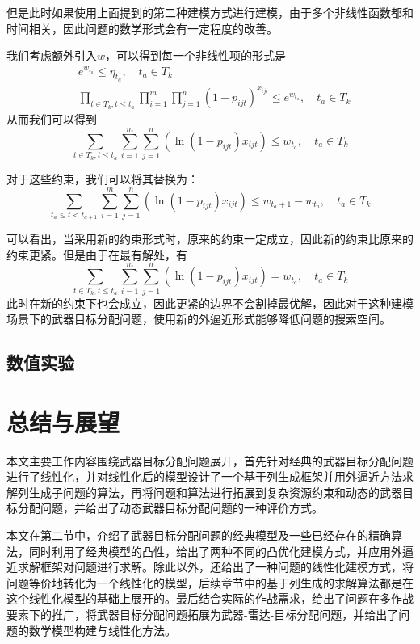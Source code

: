 但是此时如果使用上面提到的第二种建模方式进行建模，由于多个非线性函数都和时间相关，因此问题的数学形式会有一定程度的改善。

我们考虑额外引入$w$，可以得到每一个非线性项的形式是
\begin{align*}
    & e^{w_{t_a}} \leq \eta_{t_a},\quad t_a \in T_k\\
    & \prod_{t \in T_k, t \leq t_a}\prod_{i = 1}^{m}\prod_{j=1}^{n}(1-p_{ijt})^{x_{ijt}} \leq e^{w_{t_a}},\quad t_a \in T_k
\end{align*}
从而我们可以得到
\begin{equation*}
    \sum_{t \in T_k, t \leq t_a}\sum_{i = 1}^{m}\sum_{j=1}^{n}(\ln(1-p_{ijt}) x_{ijt}) \leq w_{t_a},\quad t_a \in T_k
\end{equation*}



对于这些约束，我们可以将其替换为：
\begin{equation*}
    \sum_{t_a \leq t < t_{a + 1}}\sum_{i = 1}^{m}\sum_{j=1}^{n}(\ln(1-p_{ijt}) x_{ijt}) \leq w_{t_a + 1} - w_{t_a},\quad t_a \in T_k
\end{equation*}

可以看出，当采用新的约束形式时，原来的约束一定成立，因此新的约束比原来的约束更紧。但是由于在最有解处，有
\begin{equation*}
    \sum_{t \in T_k, t \leq t_a}\sum_{i = 1}^{m}\sum_{j=1}^{n}(\ln(1-p_{ijt}) x_{ijt}) = w_{t_a},\quad t_a \in T_k
\end{equation*}
此时在新的约束下也会成立，因此更紧的边界不会割掉最优解，因此对于这种建模场景下的武器目标分配问题，使用新的外逼近形式能够降低问题的搜索空间。




\section{数值实验}
\chapter{总结与展望}
本文主要工作内容围绕武器目标分配问题展开，首先针对经典的武器目标分配问题进行了线性化，并对线性化后的模型设计了一个基于列生成框架并用外逼近方法求解列生成子问题的算法，再将问题和算法进行拓展到复杂资源约束和动态的武器目标分配问题，并给出了动态武器目标分配问题的一种评价方式。

本文在第二节中，介绍了武器目标分配问题的经典模型及一些已经存在的精确算法，同时利用了经典模型的凸性，给出了两种不同的凸优化建模方式，并应用外逼近求解框架对问题进行求解。除此以外，还给出了一种问题的线性化建模方式，将问题等价地转化为一个线性化的模型，后续章节中的基于列生成的求解算法都是在这个线性化模型的基础上展开的。最后结合实际的作战需求，给出了问题在多作战要素下的推广，将武器目标分配问题拓展为武器-雷达-目标分配问题，并给出了问题的数学模型构建与线性化方法。


